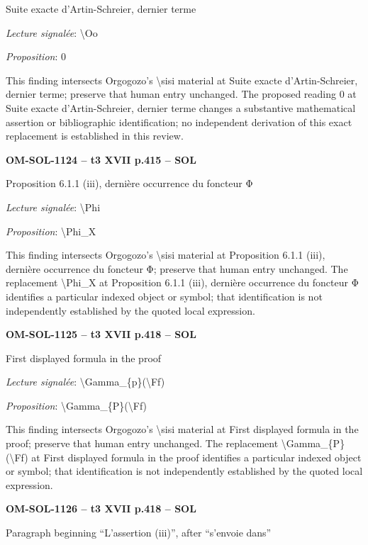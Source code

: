 Suite exacte d'Artin-Schreier, dernier terme\par
\emph{Lecture signalée}: \textbackslash{}Oo\par
\emph{Proposition}: 0\par
This finding intersects Orgogozo's \textbackslash{}sisi material at Suite exacte d'Artin-Schreier, dernier terme; preserve that human entry unchanged. The proposed reading 0 at Suite exacte d'Artin-Schreier, dernier terme changes a substantive mathematical assertion or bibliographic identification; no independent derivation of this exact replacement is established in this review.\par
\par\noindent\textbf{OM-SOL-1124 -- t3 XVII p.415 -- SOL}\par
Proposition 6.1.1 (iii), dernière occurrence du foncteur Φ\par
\emph{Lecture signalée}: \textbackslash{}Phi\par
\emph{Proposition}: \textbackslash{}Phi\_X\par
This finding intersects Orgogozo's \textbackslash{}sisi material at Proposition 6.1.1 (iii), dernière occurrence du foncteur Φ; preserve that human entry unchanged. The replacement \textbackslash{}Phi\_X at Proposition 6.1.1 (iii), dernière occurrence du foncteur Φ identifies a particular indexed object or symbol; that identification is not independently established by the quoted local expression.\par
\par\noindent\textbf{OM-SOL-1125 -- t3 XVII p.418 -- SOL}\par
First displayed formula in the proof\par
\emph{Lecture signalée}: \textbackslash{}Gamma\_\{p\}(\textbackslash{}Ff)\par
\emph{Proposition}: \textbackslash{}Gamma\_\{P\}(\textbackslash{}Ff)\par
This finding intersects Orgogozo's \textbackslash{}sisi material at First displayed formula in the proof; preserve that human entry unchanged. The replacement \textbackslash{}Gamma\_\{P\}(\textbackslash{}Ff) at First displayed formula in the proof identifies a particular indexed object or symbol; that identification is not independently established by the quoted local expression.\par
\par\noindent\textbf{OM-SOL-1126 -- t3 XVII p.418 -- SOL}\par
Paragraph beginning “L'assertion (iii)”, after “s'envoie dans”\par
